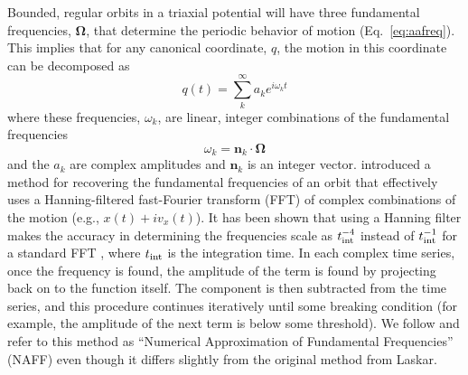 \documentclass[letterpaper,12pt,preprint]{aastex}
\newcommand{\bs}[1]{\boldsymbol{#1}}
\newcommand{\inttime}{t_{\rm int}}
\begin{document}
Bounded, regular orbits in a triaxial potential will have three fundamental frequencies, $\bs{\Omega}$, that determine the periodic behavior of motion (Eq.~\ref{eq:aafreq}). This implies that for any canonical coordinate, $q$, the motion in this coordinate can be decomposed as 
\begin{equation}
	q(t) = \sum^\infty_k a_k e^{i \omega_k t}
\end{equation}
where these frequencies, $\omega_k$, are linear, integer combinations of the fundamental frequencies
\begin{equation}
	\omega_k = \bs{n}_k \cdot \bs{\Omega}
\end{equation}
and the $a_k$ are complex amplitudes and $\bs{n}_k$ is an integer vector. \cite{laskar93} introduced a method for recovering the fundamental frequencies of an orbit that effectively uses a Hanning-filtered fast-Fourier transform (FFT) of complex combinations of the motion (e.g., $x(t) + i v_x(t)$). It has been shown that using a Hanning filter makes the accuracy in determining the frequencies scale as $\inttime^{-4}$ instead of $\inttime^{-1}$ for a standard FFT \citep{laskar99}, where $\inttime$ is the integration time. In each complex time series, once the frequency is found, the amplitude of the term is found by projecting back on to the function itself. The component is then subtracted from the time series, and this procedure continues iteratively until some breaking condition (for example, the amplitude of the next term is below some threshold). We follow \cite{valluri98} and refer to this method as ``Numerical Approximation of Fundamental Frequencies'' (NAFF) even though it differs slightly from the original method from Laskar.
\end{document}
